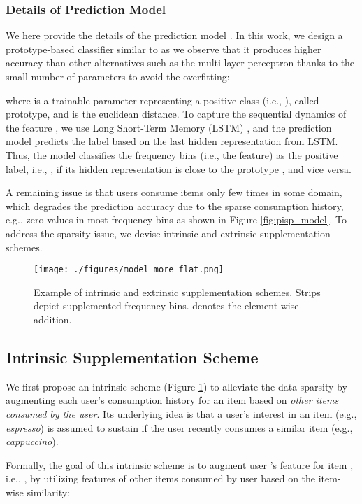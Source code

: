 \documentclass[sigconf]{acmart}
\begin{document}
\subsubsection{\textbf{Details of Prediction Model}}
\label{sec:detail}
We here provide the details of the prediction model . In this work, we design a prototype-based classifier similar to \cite{mettes2019hyperspherical} as we observe that it produces higher accuracy than other alternatives such as the multi-layer perceptron thanks to the small number of parameters to avoid the overfitting:


where  is a trainable parameter representing a positive class (i.e., ), called prototype, and  is the euclidean distance. 
To capture the sequential dynamics of the feature , we use Long Short-Term Memory (LSTM) \cite{hochreiter1997long}, and the prediction model  predicts the label based on the last hidden representation  from LSTM. 
Thus, the model  classifies the frequency bins  (i.e., the feature) as the positive label, i.e., , if its hidden representation  is close to the prototype , and vice versa. 
  

A remaining issue is that users consume items only few times in some domain, which degrades the prediction accuracy due to the sparse consumption history, e.g., zero values in most frequency bins  as shown in Figure \ref{fig:pisp_model}. To address the sparsity issue, we devise intrinsic and extrinsic supplementation schemes. 


\begin{figure}[t]
  \texttt{[image: ./figures/model\_more\_flat.png]}
  \caption{Example of intrinsic and extrinsic supplementation schemes. Strips depict supplemented frequency bins.  denotes the element-wise addition. 
  }
  \label{fig:schemes}
\end{figure}

\subsection{Intrinsic Supplementation Scheme}
\label{sec:in}
We first propose an intrinsic scheme (Figure \ref{fig:schemes}) to alleviate the data sparsity by augmenting each user's consumption history for an item based on \textit{other items consumed by the user}. 
Its underlying idea is that a user’s interest in an item (e.g., \textit{espresso}) is assumed to sustain if the user recently consumes a similar item (e.g., \textit{cappuccino}).
 
Formally, the goal of this intrinsic scheme is to augment user 's feature for item , i.e., , by utilizing features of other items consumed by user  based on the item-wise similarity: 
\end{document}
